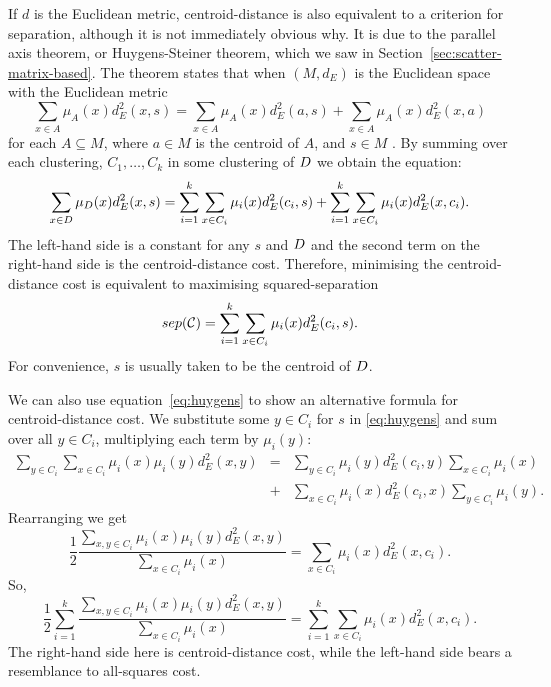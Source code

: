 If $d$ is the Euclidean metric, centroid-distance is also equivalent to a
criterion for separation, although it is not immediately obvious why.  It is
due to the parallel axis theorem, or Huygens-Steiner theorem, which we saw in
Section~\ref{sec:scatter-matrix-based}.  The theorem states that when
$(M,d_E)$ is the Euclidean space with the Euclidean metric
\begin{equation}
  \label{eq:huygens}
  \sum_{x \in A} \mu_A(x) d_E^2(x,s)
  = \sum_{x \in A} \mu_A(x) d_E^2(a,s)
  + \sum_{x \in A} \mu_A(x) d_E^2(x,a)
\end{equation}
for each $A \subseteq M$, where $a \in M$ is the centroid of $A$, and $s \in
M$ \citep{spath80}.  By summing over each clustering, $C_1,\dotsc,C_k$ in some
clustering of $D$ we obtain the equation:
\begin{equation}
  \label{eq:cd-sep-eq}
  \sum_{x \in D} \mu_{D}(x) d_E^2(x,s)
  = \sum_{i=1}^{k} \sum_{x \in C_i} \mu_i(x) d_E^2(c_i,s)
  + \sum_{i=1}^{k} \sum_{x \in C_i} \mu_i(x) d_E^2(x,c_i).
\end{equation}
The left-hand side is a constant for any $s$ and $D$ and the second term
on the right-hand side is the centroid-distance cost.  Therefore, minimising
the centroid-distance cost is equivalent to maximising squared-separation
\begin{equation*}
  sep(\mathcal{C}) = \sum_{i=1}^{k} \sum_{x \in C_i} \mu_i(x) d_E^2(c_i,s).
\end{equation*}
For convenience, $s$ is usually taken to be the centroid of $D$.

We can also use equation~\eqref{eq:huygens} to show an alternative formula for
centroid-distance cost.  We substitute some $y \in C_i$ for $s$ in
\eqref{eq:huygens} and sum over all $y \in C_i$, multiplying each term by
$\mu_i(y)$:
\begin{eqnarray*}
  \sum_{y \in C_i} \sum_{x \in C_i} \mu_i(x) \mu_i(y) d_E^2(x,y)
  &=& \sum_{y \in C_i} \mu_i(y) d_E^2(c_i,y) \sum_{x \in C_i} \mu_i(x)\\
  &+& \sum_{x \in C_i} \mu_i(x) d_E^2(c_i,x) \sum_{y \in C_i} \mu_i(y).
\end{eqnarray*}
Rearranging we get
\begin{equation*}
  \frac{1}{2}
  \frac{\displaystyle \sum_{x,y \in C_i} \mu_i(x) \mu_i(y) d_E^2(x,y)}
       {\displaystyle \sum_{x \in C_i} \mu_i(x)}
  = \sum_{x \in C_i} \mu_i(x) d_E^2(x,c_i).
\end{equation*}
So,
\begin{equation}
  \label{eq:as-cd-eq}
  \frac{1}{2}\sum_{i=1}^{k}
  \frac{\displaystyle \sum_{x,y \in C_i} \mu_i(x) \mu_i(y) d_E^2(x,y)}
       {\displaystyle \sum_{x \in C_i} \mu_i(x)}
  = \sum_{i=1}^{k} \sum_{x \in C_i} \mu_i(x) d_E^2(x,c_i).
\end{equation}
The right-hand side here is centroid-distance cost, while the left-hand side
bears a resemblance to all-squares cost.

